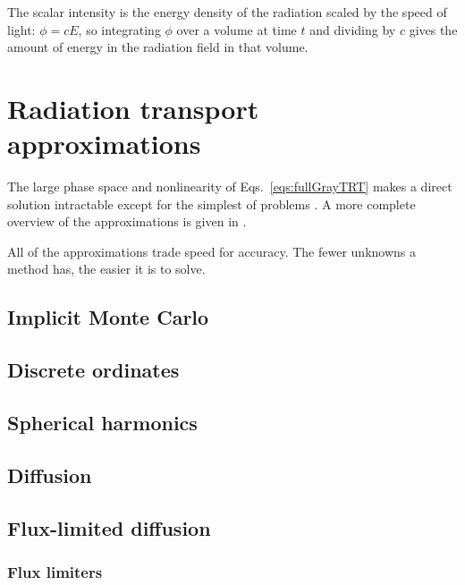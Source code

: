 The scalar
intensity is the energy density of the radiation scaled by the speed of light:
$\phi=cE$, so integrating $\phi$ over a volume at time $t$ and dividing by $c$
gives the amount of energy in the radiation field in that volume.
\section{Radiation transport approximations}\label{sec:trtApproxMethods}

The large phase space and nonlinearity of Eqs.~\eqref{eqs:fullGrayTRT} makes a
direct solution intractable except for the simplest of problems
\cite{Su1997,Mos2006}. A more complete overview of the approximations is given
in \cite{Bru2002,Ols2000,Wol2008}.

All of the approximations trade speed for accuracy. The fewer unknowns a method
has, the easier it is to solve.

\subsection{Implicit Monte Carlo}

\subsection{Discrete ordinates}

\subsection{Spherical harmonics}

\subsection{Diffusion}\label{sec:diffusion}

\subsection{Flux-limited diffusion}

\subsubsection{Flux limiters}

